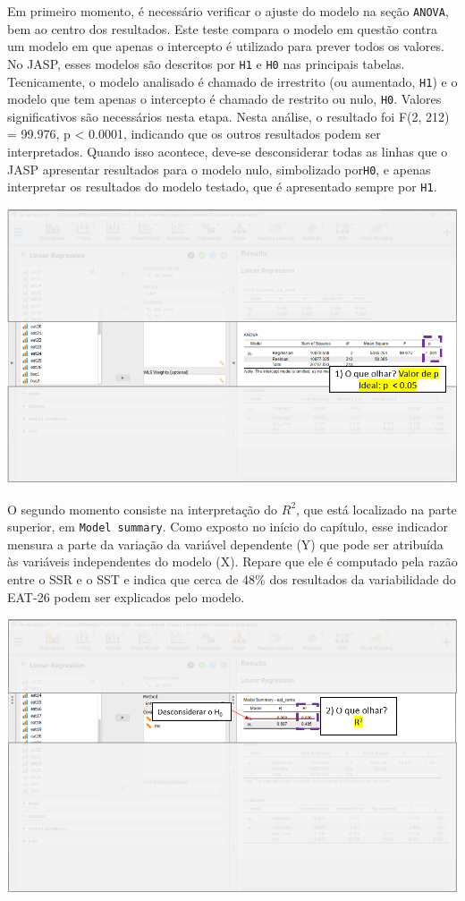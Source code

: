 \documentclass[
]{book}
\begin{document}
Em primeiro momento, é necessário verificar o ajuste do modelo na seção \texttt{ANOVA}, bem ao centro dos resultados. Este teste compara o modelo em questão contra um modelo em que apenas o intercepto é utilizado para prever todos os valores. No JASP, esses modelos são descritos por \texttt{H1} e \texttt{H0} nas principais tabelas. Tecnicamente, o modelo analisado é chamado de irrestrito (ou aumentado, \texttt{H1}) e o modelo que tem apenas o intercepto é chamado de restrito ou nulo, \texttt{H0}. Valores significativos são necessários nesta etapa. Nesta análise, o resultado foi F(2, 212) = 99.976, p \textless{} 0.0001, indicando que os outros resultados podem ser interpretados. Quando isso acontece, deve-se desconsiderar todas as linhas que o JASP apresentar resultados para o modelo nulo, simbolizado por\texttt{H0}, e apenas interpretar os resultados do modelo testado, que é apresentado sempre por \texttt{H1}.

\includegraphics{./img/cap_reg_multipla_resultado_1.png}

O segundo momento consiste na interpretação do \(R^2\), que está localizado na parte superior, em \texttt{Model\ summary}. Como exposto no início do capítulo, esse indicador mensura a parte da variação da variável dependente (Y) que pode ser atribuída às variáveis independentes do modelo (X). Repare que ele é computado pela razão entre o SSR e o SST e indica que cerca de 48\% dos resultados da variabilidade do EAT-26 podem ser explicados pelo modelo.

\includegraphics{./img/cap_reg_multipla_resultado_2.png}
\end{document}
